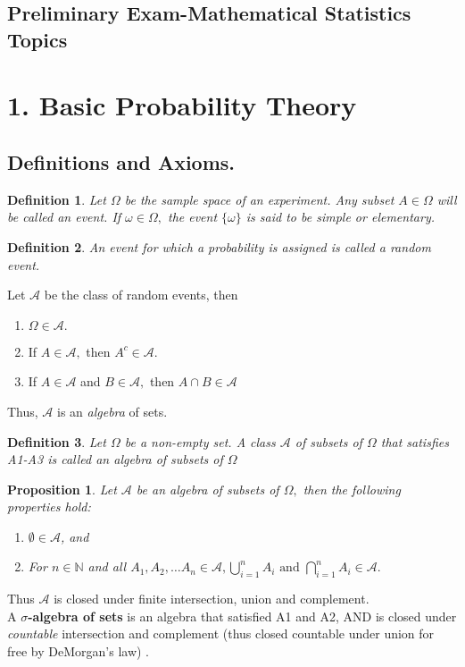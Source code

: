 \documentclass[12pt]{report} \addtolength{\textheight}{2in}
\newtheorem{defn}{Definition}
\newtheorem{prop}{Proposition}
\newcommand{\bigN}{\mathbb{N}}
\newcommand{\bigA}{\mathcal{A}}
\newcommand{\finU}{ \bigcup_{i=1}^{n}}
\newcommand{\finIn}{ \bigcap_{i=1}^{n}}
\begin{document}
\begin{center}
\section*{Preliminary Exam-Mathematical Statistics Topics}
\end{center}
\section*{1. Basic Probability Theory}
\subsection*{Definitions and Axioms.}
\begin{defn} Let $\Omega$ be the sample space of an experiment. Any subset $A\in\Omega$ will be called an \textit{event}. If $\omega \in \Omega,$ the event $\{\omega\}$ is said to be \textit{simple} or \textit{elementary}.
\end{defn}
\begin{defn} An event for which a probability is assigned is called a random event.\end{defn}
Let $\bigA$ be the class of random events, then
\begin{enumerate}
\item[A1:] $\Omega \in \bigA.$
\item[A2:] If $A \in \bigA,$ then $A^{c}\in \bigA.$
\item[A3:] If $A \in \bigA$ and $B \in \bigA,$ then $A\cap B \in \bigA$
\end{enumerate}
Thus, $\bigA$ is an \textit{algebra} of sets.
\begin{defn}
Let $\Omega$ be a non-empty set. A class $\bigA$ of subsets of $\Omega$ that satisfies A1-A3 is called an \textit{algebra of subsets of $\Omega$}  
\end{defn}
\begin{prop}
Let $\bigA$ be an algebra of subsets of $\Omega,$ then the following properties hold:
\begin{enumerate}
\item[A4:]
$\emptyset \in \bigA$, and
\item[A5:]
For $n\in \bigN$ and all $A_1, A_2,\dots A_n \in \bigA, \finU A_i \text{  and  } \finIn A_i \in \bigA.$
\end{enumerate}
\end{prop}
Thus $\bigA$ is closed under finite intersection, union and complement.\\
A \textbf{$\sigma$-algebra of sets} is an algebra that satisfied A1 and A2, AND is closed under \textit{countable} intersection and complement  (thus closed countable under union for free by DeMorgan's law) .
\end{document}
